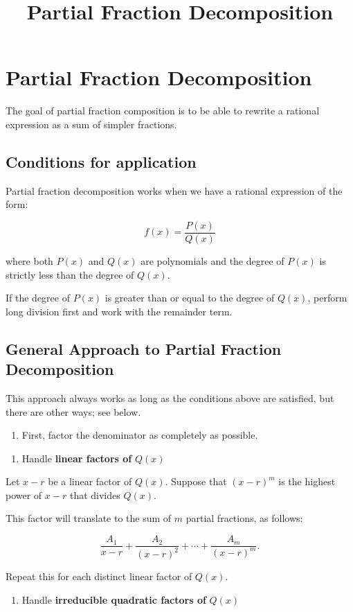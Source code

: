 \documentclass{article}
\title{Partial Fraction Decomposition}
\begin{document}
\section{Partial Fraction Decomposition}
The goal of partial fraction composition is to be able to rewrite a rational expression as a sum of simpler fractions.

\subsection{Conditions for application}

Partial fraction decomposition works when we have a rational expression of the form:

\[ f(x) = \frac{P(x)}{Q(x)} \]

where both $P(x)$ and $Q(x)$ are polynomials and the degree of $P(x)$ is strictly less than the degree of $Q(x)$.

If the degree of $P(x)$ is greater than or equal to the degree of $Q(x)$, perform long division first and work with the remainder term.

\subsection{General Approach to Partial Fraction Decomposition}

This approach always works as long as the conditions above are satisfied, but there are other ways; see below.

\begin{enumerate}
\item First, factor the denominator as completely as possible.
\end{enumerate}

\begin{enumerate}
\item Handle \textbf{linear factors of} $Q(x)$
\end{enumerate}

Let $x - r$ be a linear factor of $Q(x)$. Suppose that $(x - r)^m$ is the highest power of $x - r$ that divides $Q(x)$.

This factor will translate to the sum of $m$ partial fractions, as follows:

\[ \frac{A_1}{x-r} + \frac{A_2}{(x-r)^2} + \cdots + \frac{A_m}{(x - r)^m}. \]

Repeat this for each distinct linear factor of $Q(x)$.

\begin{enumerate}
\item Handle \textbf{irreducible quadratic factors of} $Q(x)$
\end{enumerate}
\end{document}
